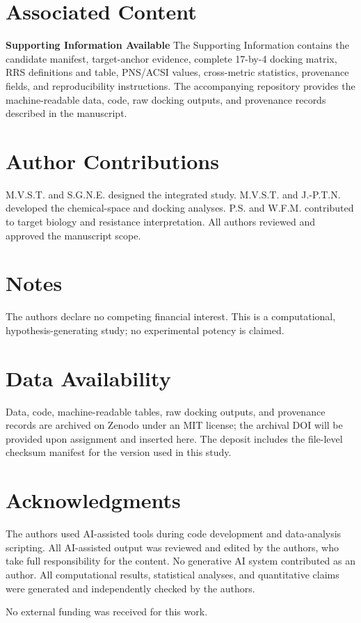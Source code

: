 \documentclass[journal=jcisd8,manuscript=article]{achemso}
\begin{document}
\section*{Associated Content}
\textbf{Supporting Information Available}
The Supporting Information contains the candidate manifest, target-anchor evidence, complete 17-by-4 docking matrix, RRS definitions and table, PNS/ACSI values, cross-metric statistics, provenance fields, and reproducibility instructions. The accompanying repository provides the machine-readable data, code, raw docking outputs, and provenance records described in the manuscript.

\section*{Author Contributions}
M.V.S.T. and S.G.N.E. designed the integrated study. M.V.S.T. and J.-P.T.N. developed the chemical-space and docking analyses. P.S. and W.F.M. contributed to target biology and resistance interpretation. All authors reviewed and approved the manuscript scope.

\section*{Notes}
The authors declare no competing financial interest. This is a computational, hypothesis-generating study; no experimental potency is claimed.

\section*{Data Availability}
Data, code, machine-readable tables, raw docking outputs, and provenance records are archived on Zenodo under an MIT license; the archival DOI will be provided upon assignment and inserted here. The deposit includes the file-level checksum manifest for the version used in this study.

\section*{Acknowledgments}
The authors used AI-assisted tools during code development and data-analysis scripting. All AI-assisted output was reviewed and edited by the authors, who take full responsibility for the content. No generative AI system contributed as an author. All computational results, statistical analyses, and quantitative claims were generated and independently checked by the authors.



\begin{acknowledgement}
No external funding was received for this work.
\end{acknowledgement}
\end{document}
